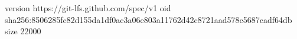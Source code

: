 version https://git-lfs.github.com/spec/v1
oid sha256:8506285fc82d155da1df0ac3a06e803a11762d42c8721aad578c5687cadf64db
size 22000
